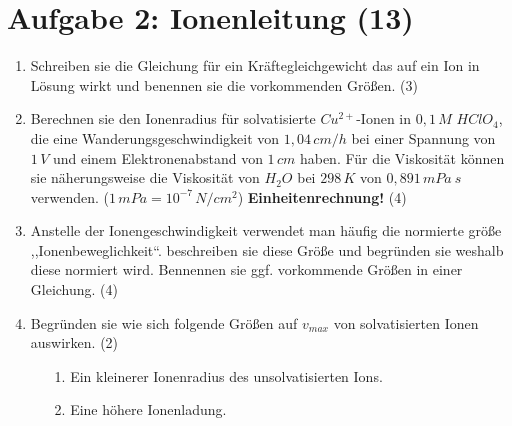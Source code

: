 \section*{Aufgabe 2: Ionenleitung (13)}
\begin{enumerate}

\item Schreiben sie die Gleichung für ein Kräftegleichgewicht das auf ein Ion in Lösung
wirkt und benennen sie die vorkommenden Größen. (3)

\item Berechnen sie den Ionenradius für solvatisierte \(Cu^{2+}\)-Ionen in \(0,1\, M\)
\(HClO_4\), die eine Wanderungsgeschwindigkeit von \(1,04 \, cm/h\) bei einer Spannung
von \(1\, V\) und einem Elektronenabstand von \(1\, cm \) haben. Für die Viskosität
können sie näherungsweise die Viskosität von \(H_2O\) bei \(298\, K\) von \(0,891\, mPa\ s\) 
verwenden. (\(1\,mPa = 10^{-7}\, N/cm^2\)) \textbf{Einheitenrechnung!} (4)

\item Anstelle der Ionengeschwindigkeit verwendet man häufig die normierte größe 
,,Ionenbeweglichkeit``. beschreiben sie diese Größe und begründen sie weshalb diese
normiert wird. Bennennen sie ggf. vorkommende Größen in einer Gleichung. (4)

\item Begründen sie wie sich folgende Größen auf \(v_{max}\) von solvatisierten Ionen
auswirken. (2)
\begin{itemize}
\item[1.] Ein kleinerer Ionenradius des unsolvatisierten Ions.
\item[2.] Eine höhere Ionenladung.
\end{itemize}
\end{enumerate}